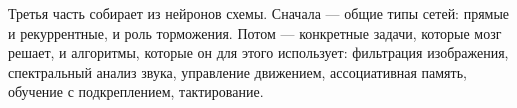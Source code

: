 \noindent Третья часть собирает из нейронов схемы. Сначала --- общие типы сетей: прямые и рекуррентные, и роль торможения. Потом --- конкретные задачи, которые мозг решает, и алгоритмы, которые он для этого использует: фильтрация изображения, спектральный анализ звука, управление движением, ассоциативная память, обучение с подкреплением, тактирование.
